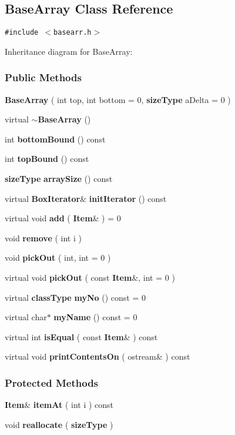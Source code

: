 \subsection{Base\-Array  Class Reference}
\label{BaseArray}
{\tt \#include $<$basearr.h$>$}

Inheritance diagram for Base\-Array:\begin{figure}[H]
\begin{center}
\leavevmode
\setlength{\epsfysize}{6cm}
\end{center}
\end{figure}
\subsubsection*{Public Methods}
\begin{CompactItemize}
\item 
{\bf Base\-Array} ( int top, int bottom = 0, {\bf size\-Type} a\-Delta = 0 )
\item 
virtual {\bf $\sim$Base\-Array} ()
\item 
int {\bf bottom\-Bound} () const
\item 
int {\bf top\-Bound} () const
\item 
{\bf size\-Type} {\bf array\-Size} () const
\item 
virtual {\bf Box\-Iterator}\& {\bf init\-Iterator} () const
\item 
virtual void {\bf add} ( {\bf Item}\& ) = 0
\item 
void {\bf remove} ( int i )
\item 
void {\bf pick\-Out} ( int, int = 0 )
\item 
virtual void {\bf pick\-Out} ( const {\bf Item}\&, int = 0 )
\item 
virtual {\bf class\-Type} {\bf my\-No} () const = 0
\item 
virtual char$\ast$ {\bf my\-Name} () const = 0
\item 
virtual int {\bf is\-Equal} ( const {\bf Item}\& ) const
\item 
virtual void {\bf print\-Contents\-On} ( ostream\& ) const
\end{CompactItemize}
\subsubsection*{Protected Methods}
\begin{CompactItemize}
\item 
{\bf Item}\& {\bf item\-At} ( int i ) const
\item 
void {\bf reallocate} ( {\bf size\-Type} )
\end{CompactItemize}
